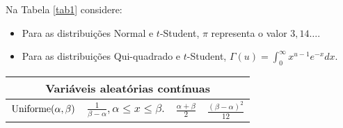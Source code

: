 \documentclass[10pt]{article}%
\renewcommand{\ra}[1]{\renewcommand{\arraystretch}{#1}}
\def\Var{{\rm Var}\,}
\def\E{{\rm E}\,}
\begin{document}
Na Tabela \ref{tab1} considere:
\begin{itemize}
\item Para as distribuições Normal e $t$-Student, $\pi$ representa o valor $3,14\ldots$.
\item Para as distribuições Qui-quadrado e $t$-Student, $\Gamma(u) = \int_0^{\infty}{x^{u-1}e^{-x}dx}$.
\end{itemize}
\begin{table*}[ht]\centering
\caption{Distribuição de probabilidade, média e variância.}
\label{tab1}
\begin{tabular}{@{}llcc@{}}
\hline
\multicolumn{4}{c}{\bf Variáveis aleatórias contínuas}\\
\midrule
${\rm Uniforme}(\alpha,\beta)$ & $\displaystyle{\frac{1}{\beta-\alpha}, \alpha\leq x\leq \beta.}$ & $\displaystyle{\frac{\alpha + \beta}{2}}$ & $\displaystyle{\frac{(\beta - \alpha)^2}{12}}$\\

\end{tabular}
\end{table*}
\end{document}

